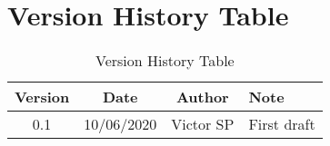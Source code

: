 \section{Version History Table}

\begin{table}[h]
	\centering
	\begin{tabular}{|c|c|c|l|}
		\hline
		Version & Date       & Author     & Note                                \\ \hline
		0.1     & 10/06/2020 & Victor SP  & First draft                         \\ \hline
	\end{tabular}
	\caption{Version History Table}
	\label{tab:version-table}
\end{table}
